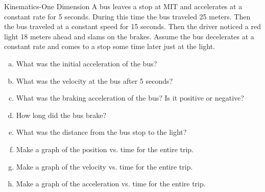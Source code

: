 \documentclass{esg8012pset}
\begin{document}
\begin{problem}{Kinematics-One Dimension}
  A bus leaves a stop at MIT and accelerates at a constant rate for 5 seconds. During this time the
  bus traveled 25 meters. Then the bus traveled at a constant speed for 15 seconds. Then the driver
  noticed a red light 18 meters ahead and slams on the brakes. Assume the bus decelerates at a
  constant rate and comes to a stop some time later just at the light.
  \begin{enumerate}[a)]
    \item What was the initial acceleration of the bus?
    \item What was the velocity at the bus after 5 seconds?
    \item What was the braking acceleration of the bus? Is it positive or negative?
    \item How long did the bus brake?
    \item What was the distance from the bus stop to the light?
    \item Make a graph of the position vs. time for the entire trip.
    \item Make a graph of the velocity vs. time for the entire trip.
    \item Make a graph of the acceleration vs. time for the entire trip.
  \end{enumerate}
\end{problem}
\end{document}

